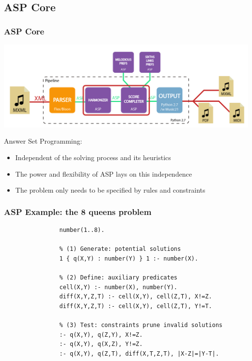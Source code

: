 \documentclass[english]{beamer}
\begin{document}
\subsection{ASP Core}
	\begin{frame}[t]
		\frametitle{ASP Core}
		\begin{center}
		\includegraphics[width=0.6\linewidth]{imagenes/arch_trans/arquitectura_final_asp_core-01.png}
		\end{center}
		Answer Set Programming:
		\begin{itemize}
			\item \alert{Independent} of the solving process and its heuristics
			\item The power and \alert{flexibility} of ASP lays on this independence
			\item The problem only needs to be specified by \alert{rules and constraints}
		\end{itemize}
	\end{frame}
	\begin{frame}[fragile]
		\frametitle{ASP Example: the 8 queens problem}
			\begin{Verbatim}[frame=single]
				% Facts
				number(1..8).
				
				% (1) Generate: potential solutions
				1 { q(X,Y) : number(Y) } 1 :- number(X).
				
				% (2) Define: auxiliary predicates
				cell(X,Y) :- number(X), number(Y).
				diff(X,Y,Z,T) :- cell(X,Y), cell(Z,T), X!=Z.
				diff(X,Y,Z,T) :- cell(X,Y), cell(Z,T), Y!=T.
				
				% (3) Test: constraints prune invalid solutions
				:- q(X,Y), q(Z,Y), X!=Z.
				:- q(X,Y), q(X,Z), Y!=Z.
				:- q(X,Y), q(Z,T), diff(X,T,Z,T), |X-Z|=|Y-T|.
			\end{Verbatim}
	\end{frame}
\end{document}

